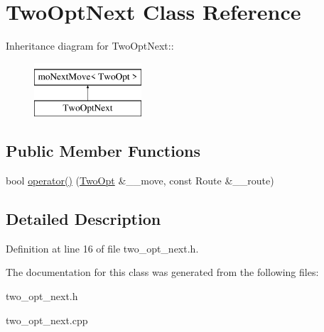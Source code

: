 \hypertarget{classTwoOptNext}{
\section{Two\-Opt\-Next Class Reference}
\label{classTwoOptNext}
}
Inheritance diagram for Two\-Opt\-Next::\begin{figure}[H]
\begin{center}
\leavevmode
\includegraphics[height=2cm]{classTwoOptNext}
\end{center}
\end{figure}
\subsection*{Public Member Functions}
\begin{CompactItemize}
\item 
\hypertarget{classTwoOptNext_baf229b2e056f39ab971cf2ac66a833e}{
bool \hyperlink{classTwoOptNext_baf229b2e056f39ab971cf2ac66a833e}{operator()} (\hyperlink{classTwoOpt}{Two\-Opt} \&\_\-\_\-move, const Route \&\_\-\_\-route)}
\label{classTwoOptNext_baf229b2e056f39ab971cf2ac66a833e}

\end{CompactItemize}


\subsection{Detailed Description}




Definition at line 16 of file two\_\-opt\_\-next.h.

The documentation for this class was generated from the following files:\begin{CompactItemize}
\item 
two\_\-opt\_\-next.h\item 
two\_\-opt\_\-next.cpp\end{CompactItemize}
